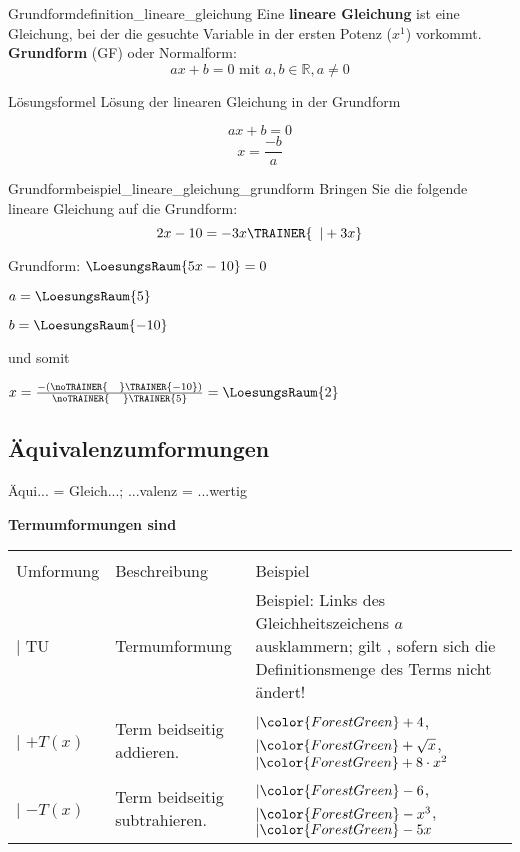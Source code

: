 \begin{definition}{Grundform}{definition_lineare_gleichung}
  Eine \textbf{lineare Gleichung} ist eine Gleichung, bei der die
  gesuchte Variable in der ersten Potenz ($x^1$) vorkommt.\\
  \textbf{Grundform} (GF) oder Normalform:\\
  $$ax+b=0 \textrm{ mit } a,b\in\mathbb{R}, a\ne 0$$
  
  \end{definition}

\begin{gesetz}{Lösungsformel}{}
 Lösung der linearen Gleichung in der Grundform

  $$ax+b=0$$
  $$x = \frac{-b}a$$
\end{gesetz}

\begin{beispiel}{Grundform}{beispiel_lineare_gleichung_grundform}
  Bringen Sie die folgende lineare Gleichung auf die Grundform:
  $$2x-10 = -3x\TRAINER{\,\,\,| +3x}$$

  Grundform: $\LoesungsRaum{5x-10} = 0$

  $a = \LoesungsRaum{5}$

  $b = \LoesungsRaum{-10}$

  und somit

  \LARGE{$x=\frac{-(\noTRAINER{\,\,\,\,\,\,}\TRAINER{-10})}{\noTRAINER{\,\,\,\,\,\,\,}\TRAINER{5}}
    = \LoesungsRaum{2}$}

\end{beispiel}


\TALS{}
  
\newpage
\subsection{Äquivalenzumformungen}
Äqui... = Gleich...; ...valenz = ...wertig



\textbf{Termumformungen sind}

\begin{tabular}{lp{6cm}p{8cm}}\hline\\%
Umformung   & Beschreibung  & Beispiel \\\hline
$| $ TU      & Termumformung & {\raggedright Beispiel: Links des Gleichheitszeichens $a$ ausklammern; gilt , sofern sich die Definitionsmenge des Terms nicht ändert!}\\
$| $ $+ T(x)$  & Term beidseitig addieren. & $| \color{ForestGreen}+4$, $| \color{ForestGreen}+\sqrt{x}$, $| \color{ForestGreen}+8\cdot{}x^2$\\
$| $ $- T(x)$  & Term beidseitig subtrahieren. & $| \color{ForestGreen}-6$, $|\color{ForestGreen}-x^3$, $|\color{ForestGreen} -5x$\\
\end{tabular}

